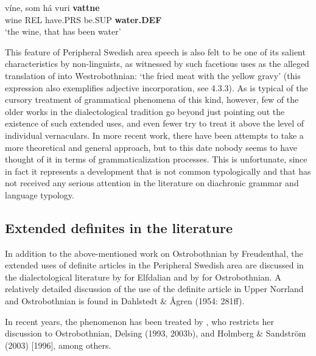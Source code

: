	\ex
		\gll	víne,  som  há  vuri  \textbf{vattne}\\
				wine  REL  have.PRS  be.SUP  \textbf{water.DEF}\\
		\glt 	‘the wine, that has been water’

	\z
\z
	
This feature of Peripheral Swedish area speech is also felt to be one of its salient characteristics by non-linguists, as witnessed by such facetious uses as the alleged translation of into Westrobothnian:  ‘the fried meat with the yellow gravy’ (this expression also exemplifies adjective incorporation, see 4.3.3). As is typical of the cursory treatment of grammatical phenomena of this kind, however, few of the older works in the dialectological tradition go beyond just pointing out the existence of such extended uses, and even fewer try to treat it above the level of individual vernaculars. In more recent work, there have been attempts to take a more theoretical and general approach, but to this date nobody seems to have thought of it in terms of grammaticalization processes. This is unfortunate, since in fact it represents a development that is not common typologically and that has not received any serious attention in the literature on diachronic grammar and language typology.


\subsection{ Extended definites in the literature}

In addition to the above-mentioned work on Ostrobothnian by Freudenthal, the extended uses of definite articles in the Peripheral Swedish area are discussed in the dialectological literature by \citet{Levander1909} for Elfdalian and by \citet{Hummelstedt1934} for Ostrobothnian. A relatively detailed discussion of the use of the definite article in Upper Norrland and Ostrobothnian is found in Dahlstedt \& Ågren (1954: 281ff). 


In recent years, the phenomenon has been treated by \citet{Nikula1997}, who restricts her discussion to Ostrobothnian, Delsing (1993, 2003b), and Holmberg \& Sandström (2003) [1996], among others.

